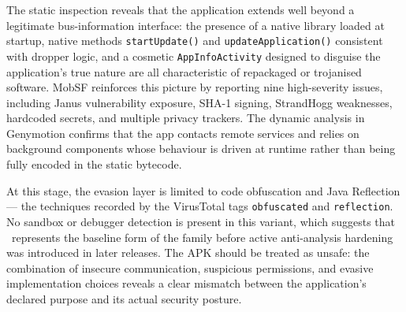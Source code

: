 The static inspection reveals that the application extends well beyond a legitimate bus-information interface: the presence of a native library loaded at startup, native methods \texttt{startUpdate()} and \texttt{updateApplication()} consistent with dropper logic, and a cosmetic \texttt{AppInfoActivity} designed to disguise the application's true nature are all characteristic of repackaged or trojanised software.
MobSF reinforces this picture by reporting nine high-severity issues, including Janus vulnerability exposure, SHA-1 signing, StrandHogg weaknesses, hardcoded secrets, and multiple privacy trackers.
The dynamic analysis in Genymotion confirms that the app contacts remote services and relies on background components whose behaviour is driven at runtime rather than being fully encoded in the static bytecode.

At this stage, the evasion layer is limited to code obfuscation and Java Reflection --- the techniques recorded by the VirusTotal tags \texttt{obfuscated} and \texttt{reflection}.
No sandbox or debugger detection is present in this variant, which suggests that \oner\ represents the baseline form of the family before active anti-analysis hardening was introduced in later releases.
The APK should be treated as unsafe: the combination of insecure communication, suspicious permissions, and evasive implementation choices reveals a clear mismatch between the application's declared purpose and its actual security posture.
